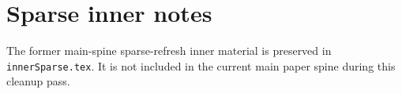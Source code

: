 \section{Sparse inner notes}
\label{sec:preserved-inner-sparse}

The former main-spine sparse-refresh inner material is preserved in \texttt{innerSparse.tex}.  It is not included in the
current main paper spine during this cleanup pass.
